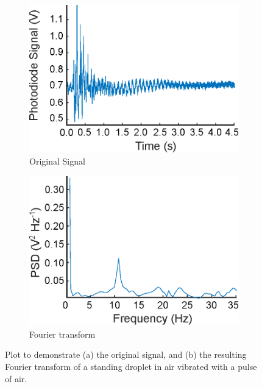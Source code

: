 \documentclass{physics_article_B}
\begin{document}
            \begin{figure}[H]
            \centering
                    \begin{subfigure}[b]{0.48\textwidth} \hspace*{0cm}\includegraphics[width=\textwidth]{Figures/WaterSignal.eps}
                    \caption{Original Signal}
                    \label{fig:Water:Signal}
                \end{subfigure}\hspace{3pt}
                \begin{subfigure}[b]{0.48\textwidth}
                    \hspace*{0.1cm}\includegraphics[width=\textwidth]{Figures/WaterSignalPD.eps}
                    \caption{Fourier transform}
                    \label{fig:Water:FT}
                \end{subfigure}
            \caption{Plot to demonstrate (a) the original signal, and (b) the resulting Fourier transform of a standing droplet in air vibrated with a pulse of air.}\label{fig:Water}
            \end{figure} 
\end{document}
